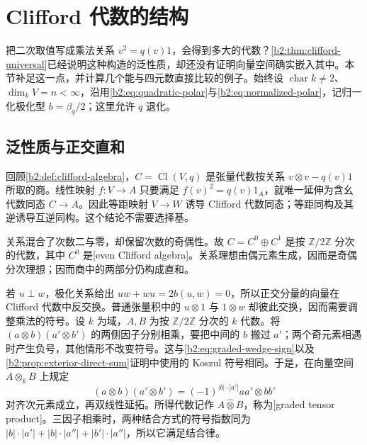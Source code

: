 
%
%

\section{Clifford 代数的结构}
\label{b2:sec:B01}

把二次取值写成乘法关系 \(v^2=q(v)1\)，会得到多大的代数？\cref{b2:thm:clifford-universal}已经说明这种构造的泛性质，却还没有证明向量空间确实嵌入其中。本节补足这一点，并计算几个能与四元数直接比较的例子。始终设 \(\operatorname{char}k\ne2\)、\(\dim_kV=n<\infty\)，沿用\eqref{b2:eq:quadratic-polar}与\eqref{b2:eq:normalized-polar}，记归一化极化型 \(b=\beta_q/2\)；这里允许 \(q\) 退化。

\subsection{泛性质与正交直和}
\label{b2:subsec:B01:01}

回顾\cref{b2:def:clifford-algebra}，\(C=\operatorname{Cl}(V,q)\) 是张量代数按关系 \(v\otimes v-q(v)1\) 所取的商。线性映射 \(f:V\to A\) 只要满足 \(f(v)^2=q(v)1_A\)，就唯一延伸为含幺代数同态 \(C\to A\)。因此等距映射 \(V\to W\) 诱导 Clifford 代数同态；等距同构及其逆诱导互逆同构。这个结论不需要选择基。

\ProseParagraphBreak
关系混合了次数二与零，却保留次数的奇偶性。故 \(C=C^0\oplus C^1\) 是按 \(\mathbb Z/2\mathbb Z\) 分次的代数，其中 \(C^0\) 是[even Clifford algebra]。关系理想由偶元素生成，因而是奇偶分次理想；因而商中的两部分仍构成直和。

\ProseParagraphBreak
若 \(u\perp w\)，极化关系给出 \(uw+wu=2b(u,w)=0\)，所以正交分量的向量在 Clifford 代数中反交换。普通张量积中的 \(u\otimes1\) 与 \(1\otimes w\) 却彼此交换，因而需要调整乘法的符号。设 \(k\) 为域，\(A,B\) 为按 \(\mathbb Z/2\mathbb Z\) 分次的 \(k\) 代数。将 \((a\otimes b)(a'\otimes b')\) 的两侧因子分别相乘，要把中间的 \(b\) 搬过 \(a'\)；两个奇元素相遇时产生负号，其他情形不改变符号。这与\eqref{b2:eq:graded-wedge-sign}以及\cref{b2:prop:exterior-direct-sum}证明中使用的 Koszul 符号相同。于是，在向量空间 \(A\otimes_kB\) 上规定
\[
	(a\otimes b)(a'\otimes b')=(-1)^{|b|\cdot|a'|}aa'\otimes bb'
\]
对齐次元素成立，再双线性延拓。所得代数记作 \(A\widehat\otimes B\)，称为[graded tensor product]。三因子相乘时，两种结合方式的符号指数同为 \(|b|\cdot|a'|+|b|\cdot|a''|+|b'|\cdot|a''|\)，所以它满足结合律。

